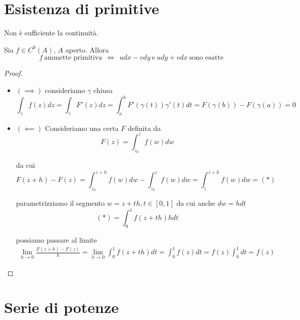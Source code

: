 \section{Esistenza di primitive}

Non è sufficiente la continuità.
\begin{thm}
Sia $f\in C^{0}(A)$, $A$ aperto. Allora
\begin{equation*}
f\ \text{ammette primitiva} \ \ \iff \ \ udx - vdy\ \text{e} \ udy + vdx\ \text{sono esatte}
\end{equation*}
\end{thm}
\begin{proof}\leavevmode
\begin{itemize}
\item $(\implies)$ consideriamo $\gamma $ chiusa
\begin{equation*}
\int_{\gamma} f(z) dz = \int_{\gamma} F'(z) dz = \int^{b}_{a} F'(\gamma (t)) \gamma'(t) dt = F(\gamma (b)) - F(\gamma (a)) = 0
\end{equation*}
\item $(\impliedby)$ Consideriamo una certa $F$ definita da
\begin{equation*}
F(z) = \int^{z}_{z_{0}} f(w) dw
\end{equation*}

da cui
\begin{equation*}
F(z + h) - F(z) = \int^{z + h}_{z_{0}} f(w) dw - \int^{z}_{z_{0}} f(w) dw = \int^{z + h}_{z} f(w) dw = (*)
\end{equation*}

parametrizziamo il segmento $w = z + th, t\in [0, 1]$ da cui anche $dw = hdt$
\begin{equation*}
(*) = \int^{1}_{0} f(z + th) hdt
\end{equation*}

possiamo passare al limite
\begin{gather*}
\lim\limits_{h\rightarrow 0}\frac{F(z + h) - F(z)}{h} = \lim\limits_{h\rightarrow 0}\int^{1}_{0} f(z + th) dt = \int^{1}_{0} f(z) dt = f(z)\int^{1}_{0} dt = f(z)
\end{gather*}

\end{itemize}
\end{proof}

\section{Serie di potenze}

